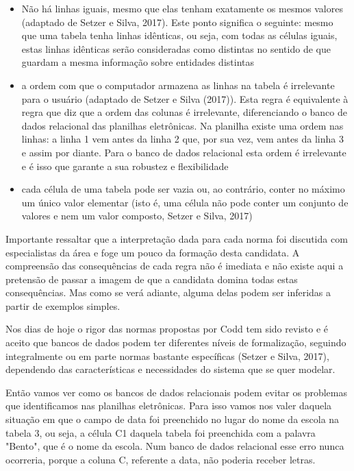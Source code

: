 \begin{itemize}
\item Não há linhas iguais, mesmo que elas tenham exatamente os mesmos valores  (adaptado de Setzer e Silva, 2017). Este ponto significa o seguinte: mesmo que uma tabela tenha linhas idênticas, ou seja, com todas as células iguais, estas linhas idênticas serão consideradas como distintas no sentido de que guardam a mesma informação sobre entidades distintas
\item a ordem com que o computador armazena as linhas na tabela é irrelevante para o usuário  (adaptado de Setzer e Silva (2017)). Esta regra é equivalente à regra que diz que a ordem das colunas é irrelevante, diferenciando o banco de dados relacional das planilhas eletrônicas. Na planilha existe uma ordem nas linhas: a linha 1 vem antes da linha 2 que, por sua vez, vem antes da linha 3 e assim por diante. Para o banco de dados relacional esta ordem é irrelevante e é isso que garante a sua robustez e flexibilidade
\item cada célula de uma tabela pode ser vazia ou, ao contrário, conter no máximo um único valor elementar (isto é, uma célula não pode conter um conjunto de valores e nem um valor composto, Setzer e Silva, 2017)
\end{itemize}

Importante ressaltar que a interpretação dada para cada norma foi discutida com especialistas da área e foge um pouco da formação desta candidata. A compreensão das consequências de cada regra não é imediata e não existe aqui a pretensão de passar a imagem de que a candidata domina todas estas consequências. Mas como se verá adiante, alguma delas podem ser inferidas a partir de exemplos simples.

Nos dias de hoje o rigor das normas propostas por Codd tem sido revisto e é aceito que bancos de dados podem ter diferentes níveis de formalização, seguindo integralmente ou em parte normas bastante específicas (Setzer e Silva, 2017), dependendo das características e necessidades do sistema que se quer modelar.

Então vamos ver como os bancos de dados relacionais podem evitar os problemas que identificamos nas planilhas eletrônicas. Para isso vamos nos valer daquela situação em que o campo de data foi preenchido no lugar do nome da escola na tabela 3, ou seja, a célula C1 daquela tabela foi preenchida com a palavra "Bento", que é o nome da escola. Num banco de dados relacional esse erro nunca ocorreria, porque a coluna C, referente a data, não poderia receber letras.

